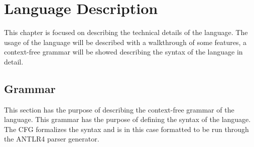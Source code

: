 \chapter{Language Description}
\label{chap:LanguageDescription}
This chapter is focused on describing the technical details of the language. The usage of the language will be described with a walkthrough of some features, a context-free grammar will be showed describing the syntax of the language in detail. 

\section{Grammar}
\label{sec:Grammar}
This section has the purpose of describing the context-free grammar of the language. This grammar has the purpose of defining the syntax of the language. The CFG formalizes the syntax and is in this case formatted to be run through the ANTLR4 parser generator.

